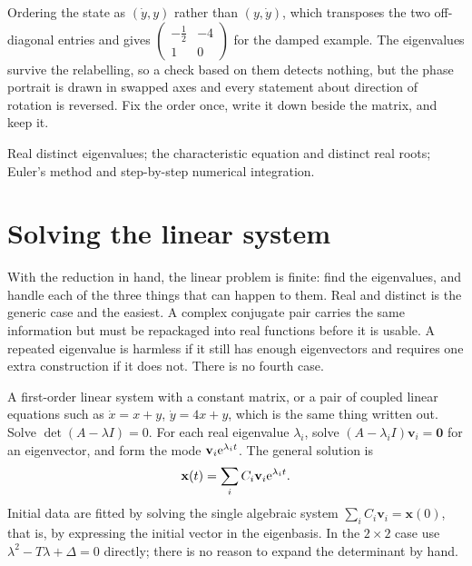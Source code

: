 \begin{trap}
Ordering the state as $(\dot y,y)$ rather than $(y,\dot y)$, which transposes the two off-diagonal entries and gives $\begin{pmatrix}-\tfrac12&-4\\1&0\end{pmatrix}$ for the damped example. The eigenvalues survive the relabelling, so a check based on them detects nothing, but the phase portrait is drawn in swapped axes and every statement about direction of rotation is reversed. Fix the order once, write it down beside the matrix, and keep it.
\end{trap}

\begin{seealsob}Real distinct eigenvalues; the characteristic equation and distinct real roots; Euler's method and step-by-step numerical integration.\end{seealsob}

\section{Solving the linear system}

With the reduction in hand, the linear problem is finite: find the eigenvalues, and handle each of the three things that can happen to them. Real and distinct is the generic case and the easiest. A complex conjugate pair carries the same information but must be repackaged into real functions before it is usable. A repeated eigenvalue is harmless if it still has enough eigenvectors and requires one extra construction if it does not. There is no fourth case.

\cue A first-order linear system with a constant matrix, or a pair of coupled linear equations such as $\dot x=x+y$, $\dot y=4x+y$, which is the same thing written out.
\method Solve $\det(A-\lambda I)=0$. For each real eigenvalue $\lambda_i$, solve $(A-\lambda_iI)\mathbf{v}_i=\mathbf{0}$ for an eigenvector, and form the mode $\mathbf{v}_i\mathrm{e}^{\lambda_it}$. The general solution is
\[\mathbf{x}(t)=\sum_iC_i\mathbf{v}_i\mathrm{e}^{\lambda_it}.\]
Initial data are fitted by solving the single algebraic system $\sum_iC_i\mathbf{v}_i=\mathbf{x}(0)$, that is, by expressing the initial vector in the eigenbasis. In the $2\times2$ case use $\lambda^{2}-T\lambda+\Delta=0$ directly; there is no reason to expand the determinant by hand.

